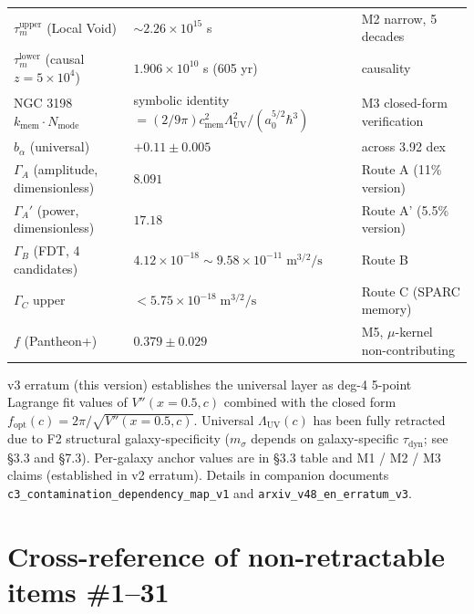 \documentclass[11pt,a4paper]{article}
\newcommand{\kmem}{k_{\mathrm{mem}}}
\newcommand{\cmem}{c_{\mathrm{mem}}}
\newcommand{\Nmode}{N_{\mathrm{mode}}}
\newcommand{\taum}{\tau_{m}}
\newcommand{\bal}{b_{\alpha}}
\newcommand{\Lambdauv}{\Lambda_{\mathrm{UV}}}
\newcommand{\GammaA}{\Gamma_{A}}
\newcommand{\GammaAp}{\Gamma_{A}'}
\newcommand{\GammaB}{\Gamma_{B}}
\newcommand{\GammaC}{\Gamma_{C}}
\newcommand{\msigma}{m_{\sigma}}
\newcommand{\fopt}{f_{\mathrm{opt}}}
\begin{document}
\begin{center}
\begin{longtable}{@{}lll@{}}
$\taum^{\mathrm{upper}}$ (Local Void) & $\sim 2.26 \times 10^{15}$ s & M2 narrow, 5 decades \\
$\taum^{\mathrm{lower}}$ (causal $z = 5 \times 10^4$) & $1.906 \times 10^{10}$ s (605 yr) & causality \\
NGC 3198 $\kmem \cdot \Nmode$ & symbolic identity $= (2/9\pi)\cmem^2\Lambdauv^2/(a_0^{5/2}\hbar^3)$ & M3 closed-form verification \\
$\bal$ (universal) & $+0.11 \pm 0.005$ & across 3.92 dex \\
$\GammaA$ (amplitude, dimensionless) & $8.091$ & Route A (11\% version) \\
$\GammaAp$ (power, dimensionless) & $17.18$ & Route A' (5.5\% version) \\
$\GammaB$ (FDT, 4 candidates) & $4.12 \times 10^{-18}\sim 9.58 \times 10^{-11}\;\mathrm{m}^{3/2}/\mathrm{s}$ & Route B \\
$\GammaC$ upper & $< 5.75 \times 10^{-18}\;\mathrm{m}^{3/2}/\mathrm{s}$ & Route C (SPARC memory) \\
$f$ (Pantheon+) & $0.379 \pm 0.029$ & M5, $\mu$-kernel non-contributing \\
\bottomrule
\end{longtable}
\end{center}

\footnotesize\noindent
v3 erratum (this version) establishes the universal layer as deg-4 5-point Lagrange fit values
of $V''(x=0.5, c)$ combined with the closed form $\fopt(c) = 2\pi/\sqrt{V''(x=0.5, c)}$. Universal
$\Lambdauv(c)$ has been fully retracted due to F2 structural galaxy-specificity ($\msigma$ depends
on galaxy-specific $\tau_{\mathrm{dyn}}$; see \S 3.3 and \S 7.3). Per-galaxy anchor values are
in \S 3.3 table and M1 / M2 / M3 claims (established in v2 erratum). Details in companion documents
\texttt{c3\_contamination\_dependency\_map\_v1} and \texttt{arxiv\_v48\_en\_erratum\_v3}.
\normalsize

\section{Cross-reference of non-retractable items \#1--31}
\end{document}
